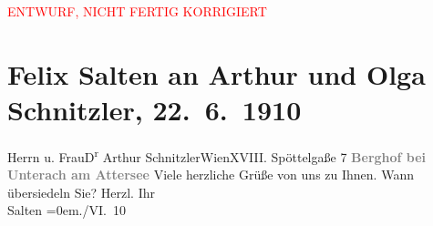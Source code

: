
\begin{center}
            \textcolor{red}{ENTWURF, NICHT FERTIG KORRIGIERT}
                      \end{center}
            
         
         \renewcommand{\erwaehntePersonen}{Personen: Olga Schnitzler}
         \renewcommand{\erwaehnteOrte}{Orte: Berghof, Edmund-Weiß-Gasse, Unterach am Attersee, Wien}
         \renewcommand{\erwaehnteWerke}{}
               \section[Felix Salten an Arthur und Olga Schnitzler, 22. 6. 1910]{ Felix Salten an Arthur und Olga Schnitzler,
               22. 6. 1910}\nopagebreak{}\rehead{ }\begin{ledgroupsized}[t]{13cm}\normalsize\beginnumbering \toendnotes[C]{\smallbreak\pagebreak[2]} 
\pstart{}{\pb}Herrn u.
                  Frau\pend{}\pstart{}D\textsuperscript{r} Arthur Schnitzler\pend{}\pstart{}Wien\pend{}\pstart{}XVIII. Spöttelgaße 7\pend{}{\bigskip}\pstart
           \noindent{}\centering{}{\pb}\textcolor{gray}{\textbf{Berghof bei Unterach am
                     Attersee}}\pend
           \pstart
           {\pb}Viele herzliche Grüße von uns
               zu Ihnen. \pend
           \pstart
           Wann übersiedeln Sie?\pend
           \pstart
           Herzl. Ihr {\\[\baselineskip]}\spacefill\mbox{Salten}\pend
           \leftskip=0em{}./VI. 10\pend
           
         
         \endnumbering{}\end{ledgroupsized}\begin{anhang}\end{anhang}\newcommand{\dateiname}{L03548}\newcommand{\titel}{Felix Salten an Arthur und Olga Schnitzler, 22. 6. 1910}\newcommand{\editorInnen}{Martin Anton Müller und Laura Untner}
      